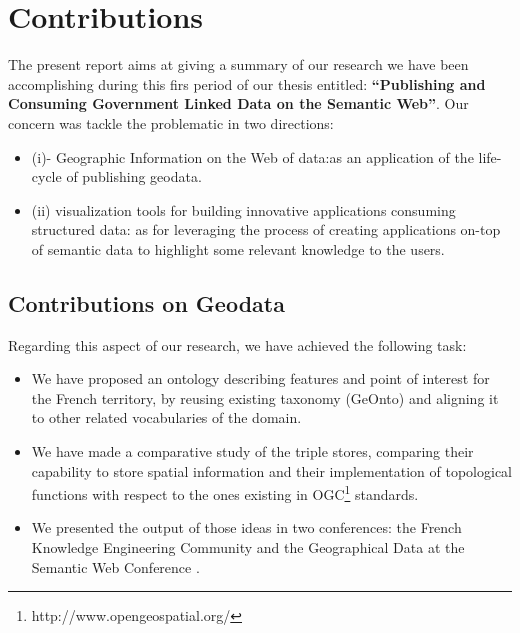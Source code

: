 \documentclass[a4paper,11pt]{report}
\begin{document}

\section{Contributions}
The present report aims at giving a summary of our research we have been accomplishing
during this firs period of our thesis entitled: \textbf{``Publishing and Consuming Government Linked Data on the Semantic Web''}. Our concern was tackle the problematic in two directions: 
\begin{itemize}
\item (i)- Geographic Information on the Web of data:as an application of the life-cycle of publishing geodata.
\item (ii) visualization tools for building innovative applications consuming structured data: as for leveraging the process of creating applications on-top of semantic data to highlight some relevant knowledge to the users.

\end{itemize}

\subsection{Contributions on Geodata}
Regarding this aspect of our research, we have achieved the following task:
 \begin{itemize}
  \item We have proposed an ontology describing features and point of interest for the French territory, by reusing existing taxonomy (GeOnto) and aligning it to other related vocabularies of 
  the domain.
 \item We have made a comparative study of the triple stores, comparing their capability to store spatial information and their implementation of topological functions with respect to the ones 
existing in OGC\footnote{http://www.opengeospatial.org/} standards.
 \item We presented the output of those ideas in two conferences: the French Knowledge Engineering Community \cite{atemezing2012a} and the Geographical Data at the Semantic Web Conference \cite{atemezing2012b}.

\end{itemize}
\end{document}
